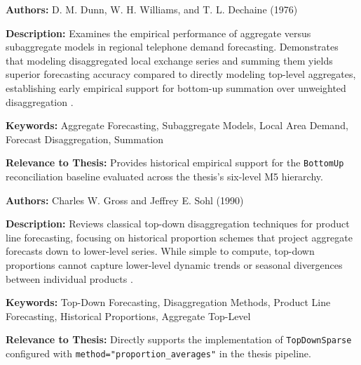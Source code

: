 {

	\textbf{Authors:}
	D. M. Dunn, W. H. Williams, and T. L. Dechaine (1976)

	\textbf{Description:}
	Examines the empirical performance of aggregate versus subaggregate models in regional telephone demand forecasting. Demonstrates that modeling disaggregated local exchange series and summing them yields superior forecasting accuracy compared to directly modeling top-level aggregates, establishing early empirical support for bottom-up summation over unweighted disaggregation \autocite{Dunn:1976}.

	\textbf{Keywords:}
	Aggregate Forecasting, Subaggregate Models, Local Area Demand, Forecast Disaggregation, Summation

	\textbf{Relevance to Thesis:}
	Provides historical empirical support for the \texttt{BottomUp} reconciliation baseline evaluated across the thesis's six-level M5 hierarchy.

}

{

	\textbf{Authors:}
	Charles W. Gross and Jeffrey E. Sohl (1990)

	\textbf{Description:}
	Reviews classical top-down disaggregation techniques for product line forecasting, focusing on historical proportion schemes that project aggregate forecasts down to lower-level series. While simple to compute, top-down proportions cannot capture lower-level dynamic trends or seasonal divergences between individual products \autocite{Gross:1990}.

	\textbf{Keywords:}
	Top-Down Forecasting, Disaggregation Methods, Product Line Forecasting, Historical Proportions, Aggregate Top-Level

	\textbf{Relevance to Thesis:}
	Directly supports the implementation of \texttt{TopDownSparse} configured with \texttt{method="proportion\_averages"} in the thesis pipeline.

}

